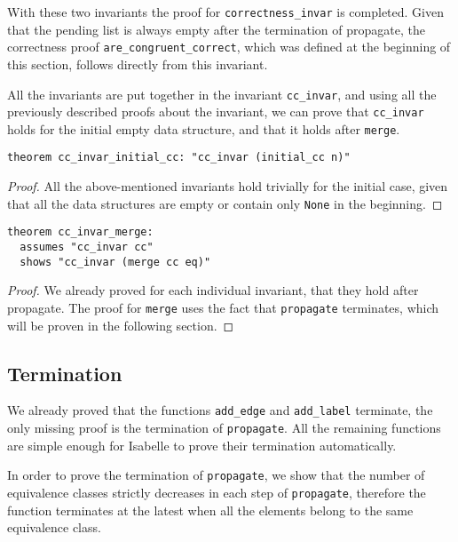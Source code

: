 With these two invariants the proof for \lstinline{correctness_invar} is completed. Given that the pending list is always empty after the termination of propagate, the correctness proof \lstinline{are_congruent_correct}, which was defined at the beginning of this section, follows directly from this invariant.

All the invariants are put together in the invariant \lstinline{cc_invar}, and using all the previously described proofs about the invariant, we can prove that \lstinline{cc_invar} holds for the initial empty data structure, and that it holds after \lstinline{merge}.

\begin{lstlisting}
theorem cc_invar_initial_cc: "cc_invar (initial_cc n)"
\end{lstlisting}

\begin{proof}
All the above-mentioned invariants hold trivially for the initial case, given that all the data structures are empty or contain only \lstinline{None} in the beginning.
\end{proof}

\begin{lstlisting}
theorem cc_invar_merge:
  assumes "cc_invar cc"
  shows "cc_invar (merge cc eq)"
\end{lstlisting}

\begin{proof}
We already proved for each individual invariant, that they hold after propagate.
The proof for \lstinline|merge| uses the fact that \lstinline{propagate} terminates, which will be proven in the following section.
\end{proof}

\subsection{Termination}\label{section:termination-propagate}

We already proved that the functions \lstinline|add_edge| and \lstinline|add_label| terminate, the only missing proof is the termination of \lstinline|propagate|. All the remaining functions are simple enough for Isabelle to prove their termination automatically.

In order to prove the termination of \lstinline{propagate}, we show that the number of equivalence classes strictly decreases in each step of \lstinline{propagate}, therefore the function terminates at the latest when all the elements belong to the same equivalence class.

